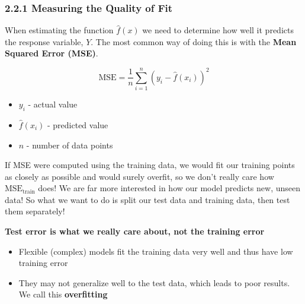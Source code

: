 \subsubsection*{2.2.1 Measuring the Quality of Fit}\label{measuring-the-quality-of-fit}

When estimating the function \(\hat f (x)\) we need to determine how well it predicts the response variable, \(Y\).
The most common way of doing this is with the \textbf{Mean Squared Error (MSE)}.

\begin{equation*} \tag{2.5}
    \text{MSE} = \frac{1}{n}\sum_{i=1}^{n}\left(y_i - \hat f(x_i) \right)^2
\end{equation*}
\begin{itemize}
    \tightlist
    \item \(y_i\) - actual value
    \item  \(\hat{f}(x_i)\) - predicted value
    \item \(n\) - number of data points
\end{itemize}

If MSE were computed using the training data, we would fit our training points as closely as possible and would surely overfit, so we don't really care how \(\text{MSE}_{\text{train}}\) does! We are far more interested in how our model predicts new, unseen data! So what we want to do is split our test data and training data, then test them separately!

\textbf{Test error is what we really care about, not the training error}

\begin{itemize}
\tightlist
\item  Flexible (complex) models fit the training data very well and thus have low training error
\item  They may not generalize well to the test data, which leads to poor results. We call this \textbf{overfitting}
\end{itemize}
